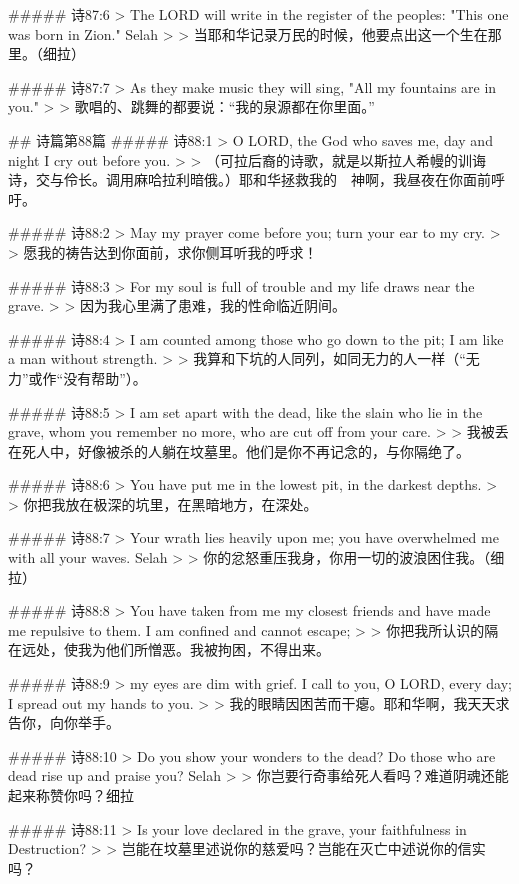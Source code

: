 ##### 诗87:6
> The LORD will write in the register of the peoples: "This one was born in Zion." Selah
>
> 当耶和华记录万民的时候，他要点出这一个生在那里。（细拉）


##### 诗87:7
> As they make music they will sing, "All my fountains are in you."
>
> 歌唱的、跳舞的都要说：“我的泉源都在你里面。”


## 诗篇第88篇
##### 诗88:1
> O LORD, the God who saves me, day and night I cry out before you.
>
> （可拉后裔的诗歌，就是以斯拉人希幔的训诲诗，交与伶长。调用麻哈拉利暗俄。）耶和华拯救我的　神啊，我昼夜在你面前呼吁。


##### 诗88:2
> May my prayer come before you; turn your ear to my cry.
>
> 愿我的祷告达到你面前，求你侧耳听我的呼求！


##### 诗88:3
> For my soul is full of trouble and my life draws near the grave.
>
> 因为我心里满了患难，我的性命临近阴间。


##### 诗88:4
> I am counted among those who go down to the pit; I am like a man without strength.
>
> 我算和下坑的人同列，如同无力的人一样（“无力”或作“没有帮助”）。


##### 诗88:5
> I am set apart with the dead, like the slain who lie in the grave, whom you remember no more, who are cut off from your care.
>
> 我被丢在死人中，好像被杀的人躺在坟墓里。他们是你不再记念的，与你隔绝了。


##### 诗88:6
> You have put me in the lowest pit, in the darkest depths.
>
> 你把我放在极深的坑里，在黑暗地方，在深处。


##### 诗88:7
> Your wrath lies heavily upon me; you have overwhelmed me with all your waves. Selah
>
> 你的忿怒重压我身，你用一切的波浪困住我。（细拉）


##### 诗88:8
> You have taken from me my closest friends and have made me repulsive to them. I am confined and cannot escape;
>
> 你把我所认识的隔在远处，使我为他们所憎恶。我被拘困，不得出来。


##### 诗88:9
> my eyes are dim with grief. I call to you, O LORD, every day; I spread out my hands to you.
>
> 我的眼睛因困苦而干瘪。耶和华啊，我天天求告你，向你举手。


##### 诗88:10
> Do you show your wonders to the dead? Do those who are dead rise up and praise you? Selah
>
> 你岂要行奇事给死人看吗？难道阴魂还能起来称赞你吗？细拉


##### 诗88:11
> Is your love declared in the grave, your faithfulness in Destruction?
>
> 岂能在坟墓里述说你的慈爱吗？岂能在灭亡中述说你的信实吗？


